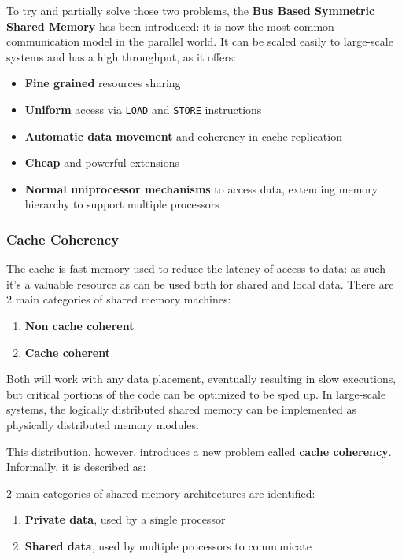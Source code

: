 \documentclass[english]{article}
\begin{document}
To try and partially solve those two problems, the \textbf{Bus Based Symmetric Shared Memory} has been introduced:
it is now the most common communication model in the parallel world.
It can be scaled easily to large-scale systems and has a high throughput, as it offers:

\begin{itemize}
  \item \textbf{Fine grained} resources sharing
  \item \textbf{Uniform} access via \texttt{LOAD} and \texttt{STORE} instructions
  \item \textbf{Automatic data movement} and coherency in cache replication
  \item \textbf{Cheap} and powerful extensions
  \item \textbf{Normal uniprocessor mechanisms} to access data, extending memory hierarchy to support multiple processors
\end{itemize}

\subsubsection{Cache Coherency}

The cache is fast memory used to reduce the latency of access to data:
as such it's a valuable resource as can be used both for shared and local data.
There are \(2\) main categories of shared memory machines:

\begin{enumerate}
  \item \textbf{Non cache coherent}
  \item \textbf{Cache coherent}
\end{enumerate}

Both will work with any data placement, eventually resulting in slow executions, but critical portions of the code can be optimized to be sped up.
In large-scale systems, the logically distributed shared memory can be implemented as physically distributed memory modules.

This distribution, however, introduces a new problem called \textbf{cache coherency}.
Informally, it is described as:


\(2\) main categories of shared memory architectures are identified:

\begin{enumerate}
  \item \textbf{Private data}, used by a single processor
  \item \textbf{Shared data}, used by multiple processors to communicate
\end{enumerate}
\end{document}
